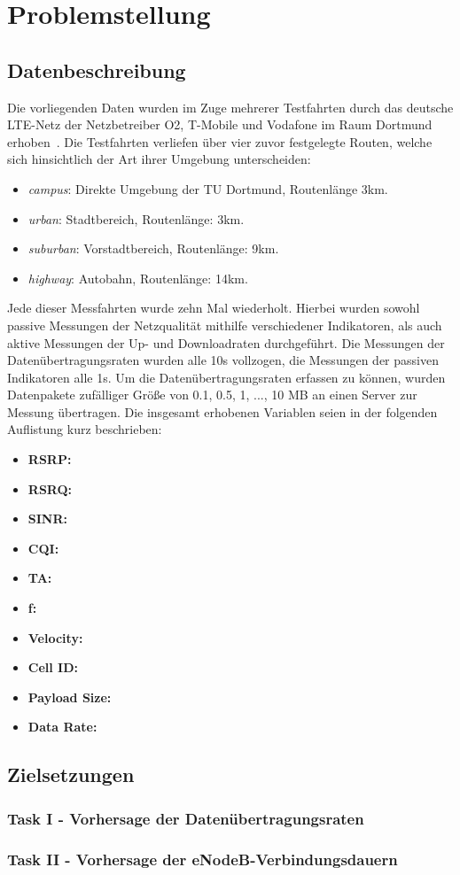 \section{Problemstellung}

\subsection{Datenbeschreibung}

Die vorliegenden Daten wurden im Zuge mehrerer Testfahrten durch das deutsche LTE-Netz der Netzbetreiber O2,
T-Mobile und Vodafone im Raum Dortmund erhoben~\cite{IEEE}.
Die Testfahrten verliefen \"uber vier zuvor festgelegte Routen, welche sich hinsichtlich der Art ihrer Umgebung unterscheiden:
\begin{itemize}
    \item \textit{campus}: Direkte Umgebung der TU Dortmund, Routenl\"ange 3km.
    \item \textit{urban}: Stadtbereich, Routenl\"ange: 3km.
    \item \textit{suburban}: Vorstadtbereich, Routenl\"ange: 9km.
    \item \textit{highway}: Autobahn, Routenl\"ange: 14km.
\end{itemize}
Jede dieser Messfahrten wurde zehn Mal wiederholt.
Hierbei wurden sowohl passive Messungen der Netzqualit\"at mithilfe verschiedener Indikatoren, als auch aktive
Messungen der Up- und Downloadraten durchgef\"uhrt.
Die Messungen der Daten\"ubertragungsraten wurden alle 10s vollzogen, die Messungen der passiven Indikatoren alle 1s.
Um die Daten\"ubertragungsraten erfassen zu k\"onnen,
wurden Datenpakete zuf\"alliger Gr\"o{\ss}e von 0.1, 0.5, 1, ..., 10 MB an einen Server zur Messung \"ubertragen.
Die insgesamt erhobenen Variablen seien in der folgenden Auflistung kurz beschrieben:
\begin{itemize}
    \item \textbf{RSRP:}
    \item \textbf{RSRQ:}
    \item \textbf{SINR:}
    \item \textbf{CQI:}
    \item \textbf{TA:}
    \item \textbf{f:}
    \item \textbf{Velocity:}
    \item \textbf{Cell ID:}
    \item \textbf{Payload Size:}
    \item \textbf{Data Rate:}
\end{itemize}

\subsection{Zielsetzungen}

\subsubsection{Task I - Vorhersage der Daten\"ubertragungsraten}

\subsubsection{Task II - Vorhersage der eNodeB-Verbindungsdauern}